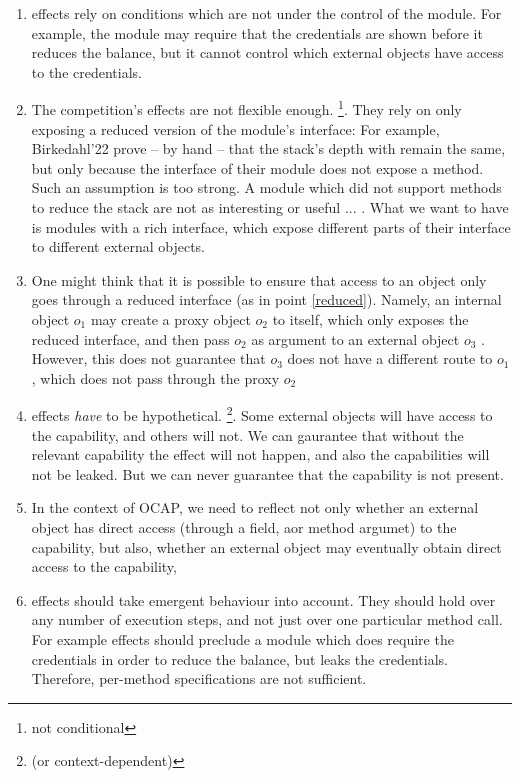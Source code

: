 \vspace{.8cm}
 \begin{enumerate}
 \item
\Tamed effects rely on conditions which are not under the control of the module. 
For example, the module may require that the credentials are shown before it reduces the balance, but it cannot control which external objects have access to the credentials. 
\item
\label{reduced}
The competition's effects  are not flexible enough. \footnote{not conditional}.
They rely on only exposing a reduced version of the module's interface:
For example, Birkedahl'22   prove -- by  hand -- that the stack's depth with remain the same, but only because the interface of their module does not expose a  method. 
Such an assumption is too strong. 
A module which did not support methods to reduce the stack are not as interesting or useful ... .
What we want to have is modules with a rich interface, which expose different parts  of their interface to different external objects.
\item
One might think that it is possible to ensure that access to an object only goes through a reduced interface (as in point  \ref{reduced}).
Namely, an internal object $o_1$ may create a proxy object $o_2$ to itself, which only exposes the reduced interface, and then pass $o_2$ as  argument to an external object $o_3$ .
However, this does not guarantee that $o_3$ does not have a different route to $o_1$, which does not pass through the proxy $o_2$
\item
\Tamed effects \emph{have} to be hypothetical. \footnote{ (or context-dependent)}.  
Some external objects will have access to the capability, and others will not. 
We can gaurantee that without the relevant capability the effect will not happen, and also the capabilities will not be leaked. 
But we can never guarantee that the capability is not present.
\item
In the context of OCAP, we need to reflect not only whether an external object has direct access (through a field, aor method  argumet) to the capability, but also, whether an external object may eventually obtain  direct access to the capability,
\item
\Tamed effects should take emergent behaviour into account. 
They should hold over any number of execution steps, and not just over one particular method call. 
For example \tamed effects should preclude  a module which does require the credentials in order to reduce the balance, but leaks the credentials. Therefore, per-method specifications are not sufficient.
\end{enumerate}


